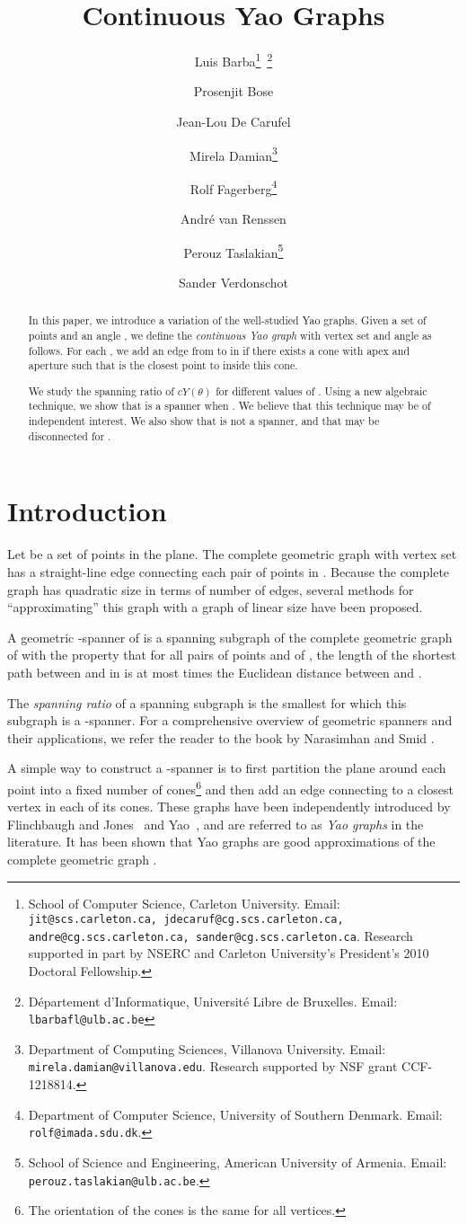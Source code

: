 \documentclass{cccg14}
\title{Continuous Yao Graphs}
\author{
Luis Barba\thanks{School of Computer Science, Carleton University. Email: \texttt{jit@scs.carleton.ca, jdecaruf@cg.scs.carleton.ca, andre@cg.scs.carleton.ca, sander@cg.scs.carleton.ca}. Research supported in part by NSERC and Carleton University's President's 2010 Doctoral Fellowship.}\ \thanks{D\'epartement d'Informatique, Universit\'e Libre de Bruxelles. Email:  \texttt{lbarbafl@ulb.ac.be}}
\and
Prosenjit Bose\footnotemark[1]
\and
Jean-Lou De Carufel\footnotemark[1]
\and
Mirela Damian\thanks{Department of Computing Sciences, Villanova University. Email: \texttt{mirela.damian@villanova.edu}. Research supported by NSF grant CCF-1218814.}
\and
Rolf Fagerberg\thanks{Department of Computer Science, University of Southern Denmark. Email: \texttt{rolf@imada.sdu.dk}.}
\and
Andr\'e van Renssen\footnotemark[1]
\and
Perouz Taslakian\thanks{School of Science and Engineering, American University of Armenia. Email: \texttt{perouz.taslakian@ulb.ac.be}.}
\and
Sander Verdonschot\footnotemark[1]
}
\newcommand{\cyao}{\ensuremath{cY(\theta)}\xspace}
\begin{document}
\thispagestyle{empty}
\maketitle

\begin{abstract}
In this paper, we introduce a variation of the well-studied Yao graphs.
Given a set of points  and an angle ,
we define the \emph{continuous Yao graph}  with vertex set  and angle  as follows. For each , we add an edge from  to  in  
if there exists a cone with apex  and aperture  such that  is the closest point to  inside this cone.

We study the spanning ratio of \cyao for different values of .
Using a new algebraic technique, we show that  is a spanner when . We believe that this technique may be of independent interest. We also show that  is not a spanner, and that  may be disconnected for .

\end{abstract}

\section{Introduction}
Let  be a set of points in the plane.
The complete geometric graph with vertex set  has a straight-line edge connecting each pair of points in . 
Because the complete graph has quadratic size in terms of number of edges, several methods for ``approximating'' this graph with a graph of linear size have been proposed. 

A geometric -spanner  of  is a spanning subgraph of the complete geometric graph of  with the property that for all pairs of points  and  of , the length of the shortest path between  and  in  is at most  times the Euclidean distance between  and .

The \emph{spanning ratio} of a spanning subgraph is the smallest  for which this subgraph is a -spanner. For a comprehensive overview of geometric spanners and their applications, we refer the reader to the book by Narasimhan and Smid \cite{NS06}.

A simple way to construct a -spanner is to first partition the plane around each point  into a fixed number of cones\footnote{The orientation of the cones is the same for all vertices.} and then add an edge connecting  to a closest vertex in each of its cones. These graphs have been independently introduced by Flinchbaugh and Jones~\cite{flinchbaugh1981strong} and Yao~\cite{yao1982constructing}, and are referred to as \emph{Yao graphs} in the literature.
It has been shown that Yao graphs are good approximations of the complete geometric graph
\cite{clarkson1987approximation,althofer1993sparse,bose2004approximating,bose2012piArxiv,damian2012yao,bose2012pi,el2009yao,barba2014new}.
\end{document}
